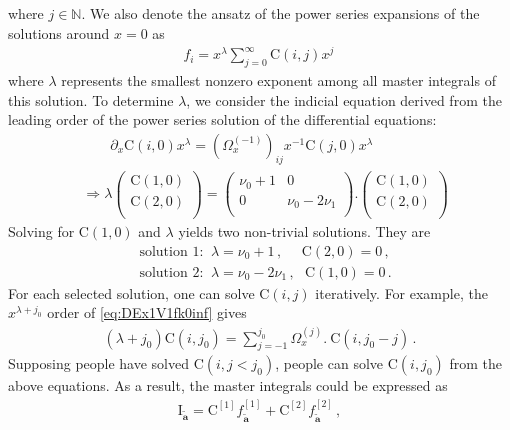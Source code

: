 \documentclass[a4paper,11pt]{article}
\newcommand{\nn}{\nonumber}
\begin{document}
where  $j\in \mathbb{N}$.
We also denote the ansatz of the power series expansions of the solutions around $x=0$ as
\begin{align}
f_{i}=x^\lambda \sum_{j=0}^\infty \text{C}(i,j) x^j\,
\end{align} 
where $\lambda$ represents the smallest nonzero exponent among all master integrals of this solution. To determine $\lambda$, we consider the indicial equation derived from the leading order of the power series solution of the differential equations:
\begin{align}
& ~~~~~~~~~ \partial_x \text{C}(i,0) x^\lambda = \left(\Omega_x^{(-1)}\right)_{ij} x^{-1} \text{C}(j,0) x^\lambda \nn\\
& \Rightarrow \lambda \left(
\begin{array}{c}
\text{C}(1,0) \\
 \text{C}(2,0) \\
\end{array}
\right) =  \left(
\begin{array}{cc}
 \nu_0+1 & 0 \\
 0 & \nu_0-2 \nu _1 \\
\end{array}
\right) . \left(
\begin{array}{c}
\text{C}(1,0) \\
 \text{C}(2,0) \\
\end{array}
\right)
\end{align} 
Solving for $\text{C}(1,0)$ and $\lambda$ yields two non-trivial solutions. They are
\begin{align}
&\text{solution 1: }~\lambda=\nu_0+1 \,,~~~~~~\text{C}(2,0)=0 \,, \nn\\
&\text{solution 2: }~\lambda=\nu_0-2\nu_1 \,,~~~\text{C}(1,0)=0 \,.
\end{align} 
For each selected solution, one can solve $\text{C}(i,j)$ iteratively. For example, the $x^{\lambda+j_0}$ order of \eqref{eq:DEx1V1fk0inf} gives
\begin{align}
(\lambda+j_0)\text{C}(i,j_0)=\sum_{j=-1}^{j_0} \Omega_x^{(j)}.~\text{C}(i,j_0-j) \,. \label{eq:seriesEqs}
\end{align}
Supposing people have solved $\text{C}(i,j<j_0)$, people can solve $\text{C}(i,j_0)$ from the above equations. As a result, the master integrals could be expressed as
\begin{align}
\text{I}_{\tilde{\bm{a}}}= \text{C}^{[1]}f_{\tilde{\bm{a}}}^{[1]}+ \text{C}^{[2]}f_{\tilde{\bm{a}}}^{[2]} \,,  \label{eq:1V1fsumsol}
\end{align}
\end{document}
